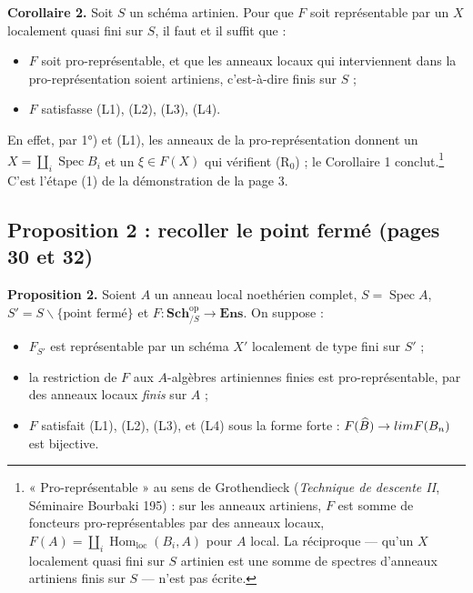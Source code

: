 \documentclass[11pt,a4paper]{article}
\begin{document}
\textbf{Corollaire 2.} Soit $S$ un schéma artinien. Pour que $F$ soit
représentable par un $X$ localement quasi fini sur $S$, il faut et il suffit
que :
\begin{itemize}
\item[1°)] $F$ soit pro-représentable, et que les anneaux locaux qui
interviennent dans la pro-représentation soient artiniens, c'est-à-dire finis
sur $S$ ;
\item[2°)] $F$ satisfasse (L1), (L2), (L3), (L4).
\end{itemize}

En effet, par 1°) et (L1), les anneaux de la pro-représentation donnent un
$X = \coprod_i \operatorname{Spec} B_i$ et un $\xi \in F(X)$ qui vérifient
(R$_0$) ; le Corollaire 1 conclut.\footnote{« Pro-représentable » au sens de
Grothendieck (\emph{Technique de descente II}, Séminaire Bourbaki 195) : sur
les anneaux artiniens, $F$ est somme de foncteurs pro-représentables par des
anneaux locaux, $F(A) = \coprod_i \operatorname{Hom}_{\mathrm{loc}}(B_i, A)$
pour $A$ local. La réciproque — qu'un $X$ localement quasi fini sur $S$
artinien est une somme de spectres d'anneaux artiniens finis sur $S$ — n'est
pas écrite.} C'est l'étape (1) de la démonstration de la page 3.

\subsection*{Proposition 2 : recoller le point fermé (pages 30 et 32)}

\textbf{Proposition 2.} Soient $A$ un anneau local noethérien complet, $S =
\operatorname{Spec} A$, $S' = S \smallsetminus \{\text{point fermé}\}$ et $F
: \mathbf{Sch}_{/S}^{\mathrm{op}} \to \mathbf{Ens}$. On suppose :
\begin{itemize}
\item[1°)] $F_{S'}$ est représentable par un schéma $X'$ localement de type
fini sur $S'$ ;
\item[2°)] la restriction de $F$ aux $A$-algèbres artiniennes finies est
pro-représentable, par des anneaux locaux \emph{finis} sur $A$ ;
\item[3°)] $F$ satisfait (L1), (L2), (L3), et (L4) sous la forme forte :
$F(\widehat{B}) \to \varprojlim F(B_n)$ est bijective.
\end{itemize}
\end{document}
